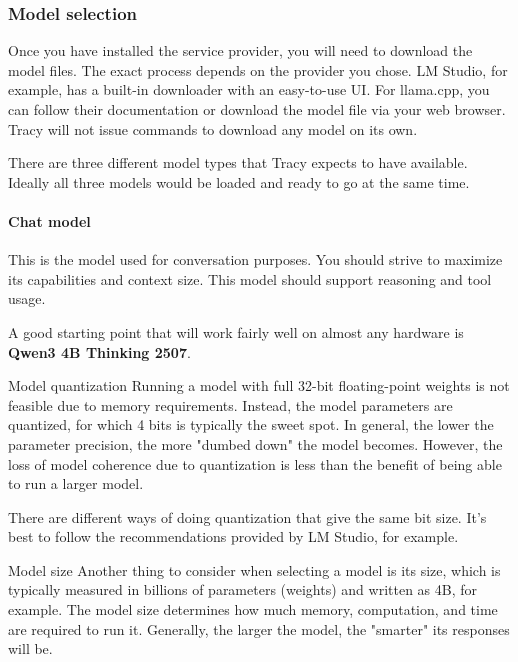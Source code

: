 \documentclass[hidelinks,titlepage,a4paper,twoside]{article}
\begin{document}
\subsubsection{Model selection}

Once you have installed the service provider, you will need to download the model files. The exact process depends on the provider you chose. LM Studio, for example, has a built-in downloader with an easy-to-use UI. For llama.cpp, you can follow their documentation or download the model file via your web browser. Tracy will not issue commands to download any model on its own.

There are three different model types that Tracy expects to have available. Ideally all three models would be loaded and ready to go at the same time.

\paragraph{Chat model}

This is the model used for conversation purposes. You should strive to maximize its capabilities and context size. This model should support reasoning and tool usage.

A good starting point that will work fairly well on almost any hardware is \textbf{Qwen3 4B Thinking 2507}.

\begin{bclogo}[
noborder=true,
couleur=black!5,
logo=\bclampe
]{Model quantization}
Running a model with full 32-bit floating-point weights is not feasible due to memory requirements. Instead, the model parameters are quantized, for which 4 bits is typically the sweet spot. In general, the lower the parameter precision, the more "dumbed down" the model becomes. However, the loss of model coherence due to quantization is less than the benefit of being able to run a larger model.

There are different ways of doing quantization that give the same bit size. It's best to follow the recommendations provided by LM Studio, for example.
\end{bclogo}

\begin{bclogo}[
noborder=true,
couleur=black!5,
logo=\bclampe
]{Model size}
Another thing to consider when selecting a model is its size, which is typically measured in billions of parameters (weights) and written as 4B, for example. The model size determines how much memory, computation, and time are required to run it. Generally, the larger the model, the "smarter" its responses will be.
\end{bclogo}
\end{document}
